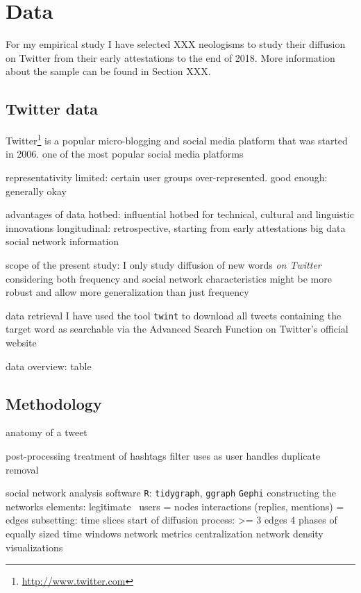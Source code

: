 \documentclass[a4paper, abstract=on]{scrartcl}
\newcommand{\sw}[1]{\texttt{#1}}
\begin{document}
\section{Data}

    For my empirical study I have selected XXX neologisms to study their diffusion on Twitter from their early attestations to the end of 2018. More information about the sample can be found in Section XXX.

  \subsection{Twitter data}

    Twitter\footnote{\url{http://www.twitter.com}} is a popular micro-blogging and social media platform that was started in 2006.
      one of the most popular social media platforms

    representativity
      limited: certain user groups over-represented.
      good enough: generally okay \parencite{Grieve2019a}

    advantages of data
      hotbed: influential hotbed for technical, cultural and linguistic innovations
      longitudinal: retrospective, starting from early attestations
      big data
      social network information

    scope of the present study:
      I only study diffusion of new words \emph{on Twitter}
        considering both frequency and social network characteristics might be more robust and allow more generalization than just frequency

    data retrieval
      I have used the tool \sw{twint}
      to download all tweets containing the target word
      as searchable via the Advanced Search Function on Twitter's official website

    data overview: table

  \subsection{Methodology}

    anatomy of a tweet

    post-processing
      treatment of hashtags
      filter uses as user handles
      duplicate removal

    social network analysis
      software
        \sw{R}: \sw{tidygraph}, \sw{ggraph}
        \sw{Gephi}
      constructing the networks
        elements: legitimate~\parencite{Goel2016}
          users = nodes
          interactions (replies, mentions) = edges
        subsetting: time slices
            start of diffusion process: >= 3 edges
            4 phases of equally sized time windows
        network metrics
          centralization
          network density
        visualizations
\end{document}
